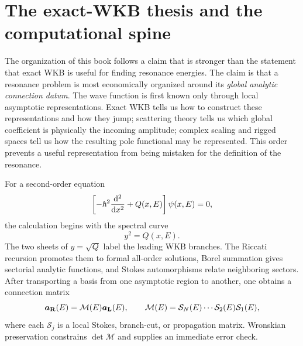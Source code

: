 \section{The exact-WKB thesis and the computational spine}
\label{sec:computational-spine}

The organization of this book follows a claim that is stronger than the
statement that exact WKB is useful for finding resonance energies.  The claim
is that a resonance problem is most economically organized around its
\textit{global analytic connection datum}.  The wave function is first known
only through local asymptotic representations.  Exact WKB tells us how to
construct these representations and how they jump; scattering theory tells
us which global coefficient is physically the incoming amplitude; complex
scaling and rigged spaces tell us how the resulting pole functional may be
represented.  This order prevents a useful representation from being
mistaken for the definition of the resonance.

For a second-order equation
\begin{equation}
  \left[-\hbar^2\frac{\mathrm{d}^2}{\mathrm{d} x^2}+Q(x,E)\right]\psi(x,E)=0,
  \label{eq:spine-equation}
\end{equation}
the calculation begins with the spectral curve
\begin{equation}
  y^2=Q(x,E).
  \label{eq:spine-spectral-curve}
\end{equation}
The two sheets of $y=\sqrt{Q}$ label the leading WKB branches.  The Riccati
recursion promotes them to formal all-order solutions, Borel summation gives
sectorial analytic functions, and Stokes automorphisms relate neighboring
sectors.  After transporting a basis from one asymptotic region to another,
one obtains a connection matrix
\begin{equation}
  \bm{a_{\mathrm{R}}}(E)
  =\mathcal M(E)\bm{a_{\mathrm{L}}}(E),
  \qquad
  \mathcal M(E)=\mathcal S_N(E)\cdots\mathcal S_2(E)\mathcal S_1(E),
  \label{eq:spine-global-connection}
\end{equation}
where each $\mathcal S_j$ is a local Stokes, branch-cut, or propagation
matrix.  Wronskian preservation constrains $\det\mathcal M$ and supplies an
immediate error check.

